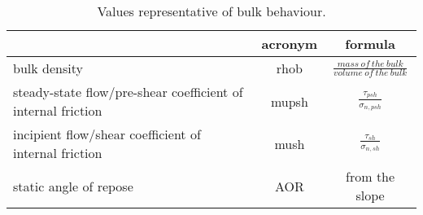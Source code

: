 \begin{table}[h]
  \centering
    \begin{tabular}{lcc}
    \hline
     & acronym & formula \\ 
     \hline
    bulk density & \ac{rhob} & $\frac{mass ~ of ~ the ~ bulk}{volume ~ of ~ the ~ bulk}$ \\ 
    [5pt]
     
    steady-state flow/pre-shear coefficient of internal friction & \ac{mupsh}
     & $\frac{\tau_{psh}}{\sigma_{n,psh}}$ \\      [5pt]
     
    incipient flow/shear coefficient of internal friction & \ac{mush} &
    $\frac{\tau_{sh}}{\sigma_{n,sh}}$ \\      [5pt]
     
    static angle of repose & \ac{AOR}   & from the slope \\
\hline
    
    \end{tabular}%
  \caption{Values representative of bulk behaviour.}
\label{tab:14bulkvalues}
\end{table}%